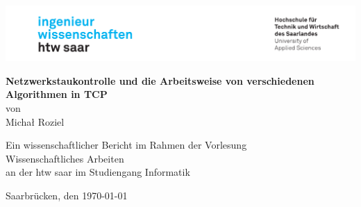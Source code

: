 \begin{titlepage}

\linespread{1.5}

\includegraphics[width=\linewidth]{graphics/htw_logo}

\begin{center}
    \large  
    \hfill
    \vfill
    \Large{\bfseries{Netzwerkstaukontrolle und die Arbeitsweise von verschiedenen Algorithmen in TCP}}\\
    
    von \\
    Michał Roziel

    \vfill
		
    Ein wissenschaftlicher Bericht im Rahmen der Vorlesung\\
    \glqq Wissenschaftliches Arbeiten\grqq\\
    an der htw saar im Studiengang Informatik\\
	
    \vfill	
    \vfill
	
    Saarbrücken, den \today
\end{center}
    
\end{titlepage}
